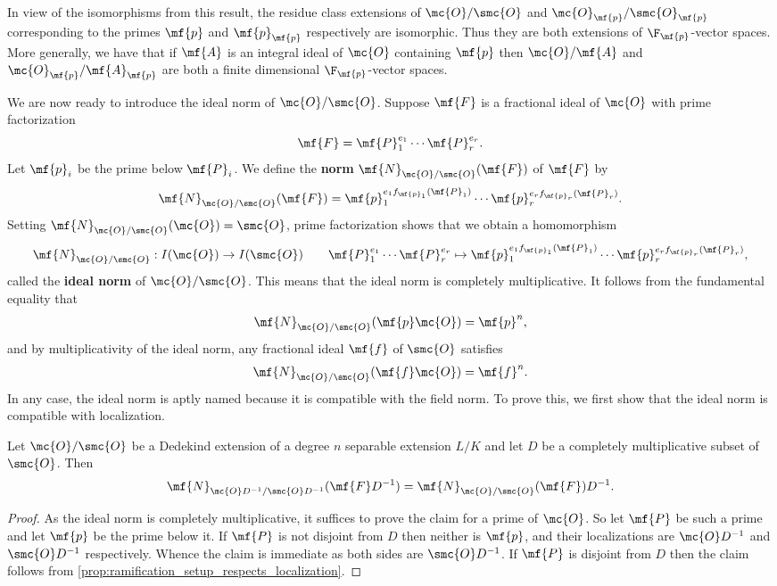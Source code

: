 \documentclass[12pt]{article}
\begin{document}
      In view of the isomorphisms from this result, the residue class extensions of \(\mc{O}/\smc{O}\) and \(\mc{O}_{\mf{p}}/\smc{O}_{\mf{p}}\) corresponding to the primes \(\mf{p}\) and \(\mf{p}_{\mf{p}}\) respectively are isomorphic. Thus they are both extensions of \(\F_{\mf{p}}\)-vector spaces. More generally, we have that if \(\mf{A}\) is an integral ideal of \(\mc{O}\) containing \(\mf{p}\) then \(\mc{O}/\mf{A}\) and \(\mc{O}_{\mf{p}}/\mf{A}_{\mf{p}}\) are both a finite dimensional \(\F_{\mf{p}}\)-vector spaces. 

      We are now ready to introduce the ideal norm of \(\mc{O}/\smc{O}\). Suppose \(\mf{F}\) is a fractional ideal of \(\mc{O}\) with prime factorization
      \[
        \mf{F} = \mf{P}_{1}^{e_{1}} \cdots \mf{P}_{r}^{e_{r}}.
      \]
      Let \(\mf{p}_{i}\) be the prime below \(\mf{P}_{i}\). We define the \textbf{norm} \(\mf{N}_{\mc{O}/\smc{O}}(\mf{F})\) of \(\mf{F}\) by
      \[
        \mf{N}_{\mc{O}/\smc{O}}(\mf{F}) = \mf{p}_{1}^{e_{1}f_{\mf{p}_{1}}(\mf{P}_{1})} \cdots \mf{p}_{r}^{e_{r}f_{\mf{p}_{r}}(\mf{P}_{r})}.
      \]
      Setting \(\mf{N}_{\mc{O}/\smc{O}}(\mc{O}) = \smc{O}\), prime factorization shows that we obtain a homomorphism
      \[
        \mf{N}_{\mc{O}/\smc{O}}:I(\mc{O}) \to I(\smc{O}) \qquad \mf{P}_{1}^{e_{1}} \cdots \mf{P}_{r}^{e_{r}} \mapsto \mf{p}_{1}^{e_{1}f_{\mf{p}_{1}}(\mf{P}_{1})} \cdots \mf{p}_{r}^{e_{r}f_{\mf{p}_{r}}(\mf{P}_{r})},
      \]
      called the \textbf{ideal norm} of \(\mc{O}/\smc{O}\). This means that the ideal norm is completely multiplicative. It follows from the fundamental equality that
      \[
        \mf{N}_{\mc{O}/\smc{O}}(\mf{p}\mc{O}) = \mf{p}^{n},
      \]
      and by multiplicativity of the ideal norm, any fractional ideal \(\mf{f}\) of \(\smc{O}\) satisfies
      \[
        \mf{N}_{\mc{O}/\smc{O}}(\mf{f}\mc{O}) = \mf{f}^{n}.
      \]
      In any case, the ideal norm is aptly named because it is compatible with the field norm. To prove this, we first show that the ideal norm is compatible with localization.

      \begin{proposition}\label{prop:ideal_norm_localization_is_localization_of_ideal_norm}
        Let \(\mc{O}/\smc{O}\) be a Dedekind extension of a degree \(n\) separable extension \(L/K\) and let \(D\) be a completely multiplicative subset of \(\smc{O}\). Then
        \[
          \mf{N}_{\mc{O}D^{-1}/\smc{O}D^{-1}}(\mf{F}D^{-1}) = \mf{N}_{\mc{O}/\smc{O}}(\mf{F})D^{-1}.
        \]
      \end{proposition}
      \begin{proof}
        As the ideal norm is completely multiplicative, it suffices to prove the claim for a prime of \(\mc{O}\). So let \(\mf{P}\) be such a prime and let \(\mf{p}\) be the prime below it. If \(\mf{P}\) is not disjoint from \(D\) then neither is \(\mf{p}\), and their localizations are \(\mc{O}D^{-1}\) and \(\smc{O}D^{-1}\) respectively. Whence the claim is immediate as both sides are \(\smc{O}D^{-1}\). If \(\mf{P}\) is disjoint from \(D\) then the claim follows from \cref{prop:ramification_setup_respects_localization}.
      \end{proof}
\end{document}
